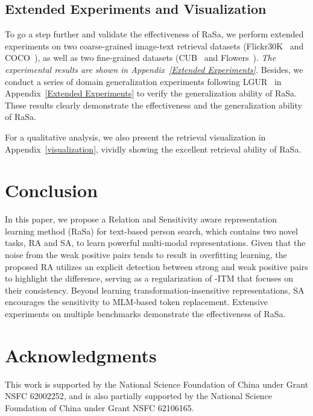 \documentclass{article}
\begin{document}
\subsection{Extended Experiments and Visualization}





To go a step further and validate the effectiveness of RaSa, we perform extended experiments on two coarse-grained image-text retrieval datasets (Flickr30K~\cite{plummer2015flickr30k} and COCO~\cite{lin2014microsoft}), as well as two fine-grained datasets (CUB~\cite{reed2016learning} and Flowers~\cite{reed2016learning}). 
\emph{The experimental results are shown in Appendix~\ref{Extended Experiments}.}
Besides, we conduct a series of domain generalization experiments following LGUR~\cite{shao2022learning} in Appendix~\ref{Extended Experiments} to verify the generalization ability of RaSa. These results clearly demonstrate the effectiveness and the generalization ability of RaSa. 

For a qualitative analysis, we also present the retrieval visualization in Appendix~\ref{visualization}, vividly showing the excellent retrieval ability of RaSa.



\section{Conclusion}
In this paper, we propose a Relation and Sensitivity aware representation learning method (RaSa) for text-based person search, which contains two novel tasks, RA and SA, to learn powerful multi-modal representations. 
Given that the noise from the weak positive pairs tends to result in overfitting learning, the proposed RA utilizes an explicit detection between strong and weak positive pairs to highlight the difference, serving as a regularization of -ITM that focuses on their consistency. 
Beyond learning transformation-insensitive representations, SA encourages the sensitivity to MLM-based token replacement.
Extensive experiments on multiple benchmarks demonstrate the effectiveness of RaSa.



\section*{Acknowledgments}
This work is supported by the National Science Foundation of China under Grant NSFC 62002252, and is also partially supported by the National Science Foundation of China under Grant NSFC 62106165.
\end{document}
